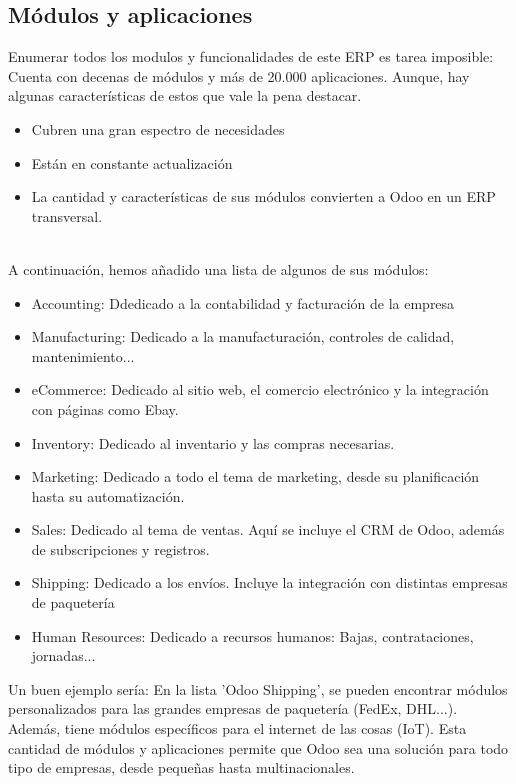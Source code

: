 \documentclass[openany,overnay,a4paper, twoside, 12pt]{book}
\begin{document}
\subsection{Módulos y aplicaciones}
Enumerar todos los modulos y funcionalidades de este ERP es tarea imposible: Cuenta con decenas de módulos y más de 20.000 aplicaciones. Aunque, hay algunas características de estos que vale la pena destacar. 
\begin{itemize}
    \item Cubren una gran espectro de necesidades 
    \item Están en constante actualización 
    \item La cantidad y características de sus módulos convierten a Odoo en un ERP transversal. 
\end{itemize}
\\
 A continuación, hemos añadido una lista de algunos de sus módulos:
\begin{itemize}
    \item Accounting: Ddedicado a la contabilidad y facturación de la empresa
    \item Manufacturing: Dedicado a la manufacturación, controles de calidad, mantenimiento...
    \item eCommerce: Dedicado al sitio web, el comercio electrónico y la integración con páginas como Ebay. 
    \item Inventory: Dedicado al inventario y las compras necesarias. 
    \item Marketing: Dedicado a todo el tema de marketing, desde su planificación hasta su automatización.
    \item Sales: Dedicado al tema de ventas. Aquí se incluye el CRM de Odoo, además de subscripciones y registros.
    \item Shipping: Dedicado a los envíos. Incluye la integración con distintas empresas de paquetería
    \item Human Resources: Dedicado a recursos humanos: Bajas, contrataciones, jornadas...
\end{itemize}
\newpage

Un buen ejemplo sería: En la lista 'Odoo Shipping', se pueden encontrar módulos personalizados para las grandes empresas de paquetería (FedEx, DHL...).\\
Además, tiene módulos específicos para el internet de las cosas (IoT). Esta cantidad de módulos y aplicaciones permite que Odoo sea una solución para todo tipo de empresas, desde pequeñas hasta multinacionales.\\\\
\end{document}
